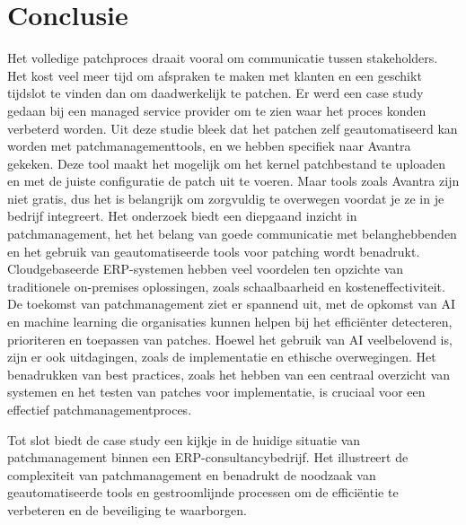 
\chapter{Conclusie}%
\label{ch:conclusie}


Het volledige patchproces draait vooral om communicatie tussen stakeholders. Het kost veel meer tijd om afspraken te maken met klanten en een geschikt tijdslot te vinden dan om daadwerkelijk te patchen. Er werd een 
case study gedaan bij een managed service provider om te zien waar het proces konden verbeterd worden. Uit deze studie bleek dat het patchen zelf geautomatiseerd kan worden
met patchmanagementtools, en we hebben specifiek naar Avantra gekeken. Deze tool maakt het mogelijk om het kernel patchbestand te uploaden en met de juiste configuratie de patch uit te voeren.
Maar tools zoals Avantra zijn niet gratis, dus het is belangrijk om zorgvuldig te overwegen voordat je ze in je bedrijf integreert.
Het onderzoek biedt een diepgaand inzicht in patchmanagement, het het belang van goede communicatie met belanghebbenden en het gebruik van geautomatiseerde tools voor patching wordt benadrukt. Cloudgebaseerde ERP-systemen 
hebben veel voordelen ten opzichte van traditionele on-premises oplossingen, zoals schaalbaarheid en kosteneffectiviteit. De toekomst
van patchmanagement ziet er spannend uit, met de opkomst van AI en machine learning die organisaties kunnen helpen bij het efficiënter detecteren, prioriteren en toepassen van patches. Hoewel het gebruik van AI veelbelovend is, zijn er ook uitdagingen, zoals de implementatie en ethische overwegingen.
Het benadrukken van best practices, zoals het hebben van een centraal overzicht van systemen en het testen van patches voor implementatie, is cruciaal voor een effectief patchmanagementproces.

Tot slot biedt de case study een kijkje in de huidige situatie van patchmanagement binnen een ERP-consultancybedrijf. Het illustreert de complexiteit van patchmanagement en benadrukt de noodzaak van geautomatiseerde tools en gestroomlijnde 
processen om de efficiëntie te verbeteren en de beveiliging te waarborgen.
